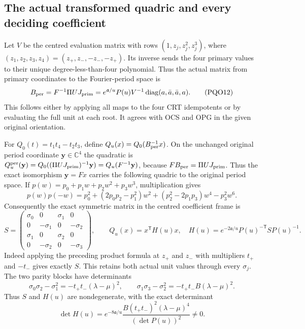 \documentclass[11pt,a4paper]{article}
\begin{document}
\subsection{The actual transformed quadric and every deciding coefficient}
Let $V$ be the centred evaluation matrix with rows
$(1,z_j,z_j^2,z_j^3)$, where
$(z_1,z_2,z_3,z_4)=(z_+,z_-,-z_-,-z_+)$. Its inverse sends
the four primary values to their unique degree-less-than-four
polynomial. Thus the actual matrix from primary coordinates
to the Fourier-period space is
\[
 B_{\rm per}=F^{-1}\Pi UJ_{\rm prim}
       =e^{\mathfrak a/u}P(u)V^{-1}
                         \operatorname{diag}(a,\bar a,\bar a,a).
 \tag{PQO12}
\]
This follows either by applying all maps to the four CRT
idempotents or by evaluating the full unit at each root.
It agrees with OCS and OPG in the given original orientation.

For $Q_0(t)=t_1t_4-t_2t_3$, define
$Q_u(x)=Q_0(B_{\rm per}^{-1}x)$. On the unchanged original
period coordinate $\mathbf y\in\mathbb C^4$ the quadratic is
$Q_u^{\rm per}(\mathbf y)=Q_0((\Pi UJ_{\rm prim})^{-1}\mathbf y)
 =Q_u(F^{-1}\mathbf y)$, because $FB_{\rm per}=\Pi UJ_{\rm prim}$.
Thus the exact isomorphism $\mathbf y=Fx$ carries the following
quadric to the original period space. If
$p(w)=p_0+p_1w+p_2w^2+p_3w^3$, multiplication gives
\[
 p(w)p(-w)=p_0^2+(2p_0p_2-p_1^2)w^2
                     +(p_2^2-2p_1p_3)w^4-p_3^2w^6.
\]
Consequently the exact symmetric matrix in the centred
coefficient frame is
\[
 S=\begin{pmatrix}
 \sigma_0&0&\sigma_1&0\\
 0&-\sigma_1&0&-\sigma_2\\
 \sigma_1&0&\sigma_2&0\\
 0&-\sigma_2&0&-\sigma_3
 \end{pmatrix},\qquad
 \boxed{Q_u(x)=x^{\mathsf T}H(u)x,
 \quad H(u)=e^{-2\mathfrak a/u}P(u)^{-\mathsf T}S P(u)^{-1}.}
 \tag{PQO13}
\]
Indeed applying the preceding product formula at $z_+$ and
$z_-$ with multipliers $t_+$ and $-t_-$ gives exactly $S$.
This retains both actual unit values through every $\sigma_j$.
The two parity blocks have determinants
\[
 \sigma_0\sigma_2-\sigma_1^2
          =-t_+t_-(\lambda-\mu)^2,\qquad
 \sigma_1\sigma_3-\sigma_2^2
          =-t_+t_-B(\lambda-\mu)^2.
\]
Thus $S$ and $H(u)$ are nondegenerate, with the exact determinant
\[
 \det H(u)=e^{-8\mathfrak a/u}
       \frac{B(t_+t_-)^2(\lambda-\mu)^4}{(\det P(u))^2}\ne0.
 \tag{PQO14}
\]
\end{document}
